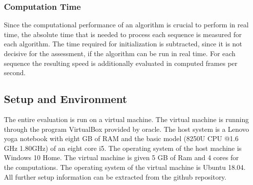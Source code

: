 \subsubsection{Computation Time}
	
	Since the computational performance of an algorithm is crucial to perform in real time, the absolute time that is needed to process each 
	sequence is measured for each algorithm. The time required for initialization is subtracted, since it is not decisive for the assessment, 
	if the algorithm can be run in real time. For each sequence the resulting speed is additionally evaluated in computed frames per second. 
	
\subsection{Setup and Environment}

	
	The entire evaluation is run on a virtual machine. The virtual machine is running through the program VirtualBox provided by oracle.
	The host system is a Lenovo yoga notebook with eight GB of RAM and the basic model (8250U CPU @1.6 
	GHz 1.80GHz) of an eight core i5. The operating system of the host machine is Windows 10 Home. The virtual
	machine is given 5 GB of Ram and 4 cores for the computations. The operating system of the virtual machine is Ubuntu 18.04. All further setup information can be extracted 
	from the github repository.
